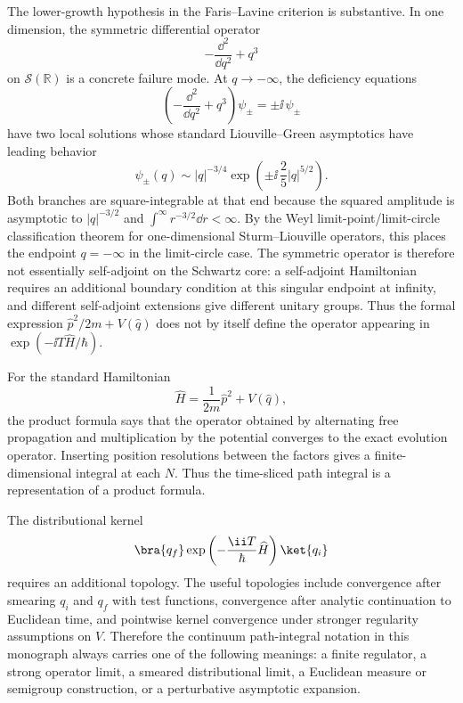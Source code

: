 \begin{example}
\label{ex:cubic-potential-limit-circle-failure}
The lower-growth hypothesis in the Faris--Lavine criterion is substantive.  In
one dimension, the symmetric differential operator
\[
  -\frac{\dd^2}{\dd q^2}+q^3
\]
on \(\mathcal S(\mathbb R)\) is a concrete failure mode.  At
\(q\to-\infty\), the deficiency equations
\[
  \left(-\frac{\dd^2}{\dd q^2}+q^3\right)\psi_\pm=\pm\ii\,\psi_\pm
\]
have two local solutions whose standard Liouville--Green asymptotics have
leading behavior
\[
  \psi_\pm(q)\sim |q|^{-3/4}
  \exp\left(\pm\ii\,\frac{2}{5}|q|^{5/2}\right).
\]
Both branches are square-integrable at that end because the squared amplitude
is asymptotic to \(|q|^{-3/2}\) and
\(\int^\infty r^{-3/2}\dd r<\infty\).  By the Weyl
limit-point/limit-circle classification theorem for one-dimensional
Sturm--Liouville operators, this places the endpoint \(q=-\infty\) in the
limit-circle case.  The symmetric operator is therefore not essentially
self-adjoint on the Schwartz core: a self-adjoint Hamiltonian requires an
additional boundary condition at this singular endpoint at infinity, and
different self-adjoint extensions give different unitary groups.  Thus the
formal expression
\(\widehat p^2/2m+V(\widehat q)\) does not by itself define the operator
appearing in \(\exp(-\ii T\widehat H/\hbar)\).
\end{example}

For the standard Hamiltonian
\[
  \widehat H=\frac{1}{2m}\widehat p^2+V(\widehat q),
\]
the product formula says that the operator obtained by alternating free
propagation and multiplication by the potential converges to the exact
evolution operator.  Inserting position resolutions between the factors gives
a finite-dimensional integral at each \(N\).  Thus the time-sliced path
integral is a representation of a product formula.

The distributional kernel
\[
  \bra{q_f}\exp\left(-\frac{\ii T}{\hbar}\widehat H\right)\ket{q_i}
\]
requires an additional topology.  The useful topologies include convergence
after smearing \(q_i\) and \(q_f\) with test functions, convergence after
analytic continuation to Euclidean time, and pointwise kernel convergence
under stronger regularity assumptions on \(V\).  Therefore the continuum
path-integral notation in this monograph always carries one of the following
meanings: a finite regulator, a strong operator limit, a smeared
distributional limit, a Euclidean measure or semigroup construction, or a
perturbative asymptotic expansion.

